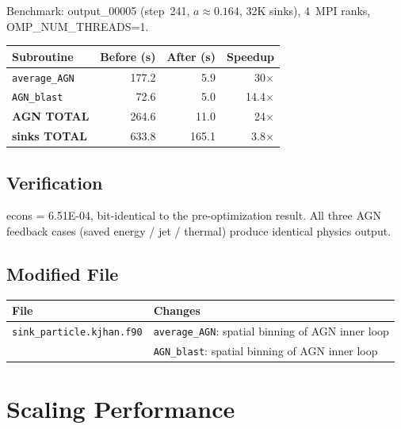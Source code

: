 \documentclass[11pt,fleqn]{book}
\begin{document}
Benchmark: output\_00005 (step~241, $a \approx 0.164$, 32K sinks), 4~MPI ranks, OMP\_NUM\_THREADS=1.

\begin{center}
\begin{tabular}{lrrr}
\toprule
\textbf{Subroutine} & \textbf{Before (s)} & \textbf{After (s)} & \textbf{Speedup} \\
\midrule
\texttt{average\_AGN} & 177.2 & 5.9 & 30$\times$ \\
\texttt{AGN\_blast}   &  72.6 & 5.0 & 14.4$\times$ \\
\midrule
\textbf{AGN TOTAL}    & 264.6 & 11.0 & 24$\times$ \\
\textbf{sinks TOTAL}  & 633.8 & 165.1 & 3.8$\times$ \\
\bottomrule
\end{tabular}
\end{center}

\section{Verification}

econs = 6.51E-04, bit-identical to the pre-optimization result. All three AGN feedback cases (saved energy / jet / thermal) produce identical physics output.

\section{Modified File}

\begin{center}
\begin{tabular}{lp{8cm}}
\toprule
\textbf{File} & \textbf{Changes} \\
\midrule
\texttt{sink\_particle.kjhan.f90} & \texttt{average\_AGN}: spatial binning of AGN inner loop \\
                                   & \texttt{AGN\_blast}: spatial binning of AGN inner loop \\
\bottomrule
\end{tabular}
\end{center}


\chapter{Scaling Performance}
\label{ch:scaling}
\end{document}
